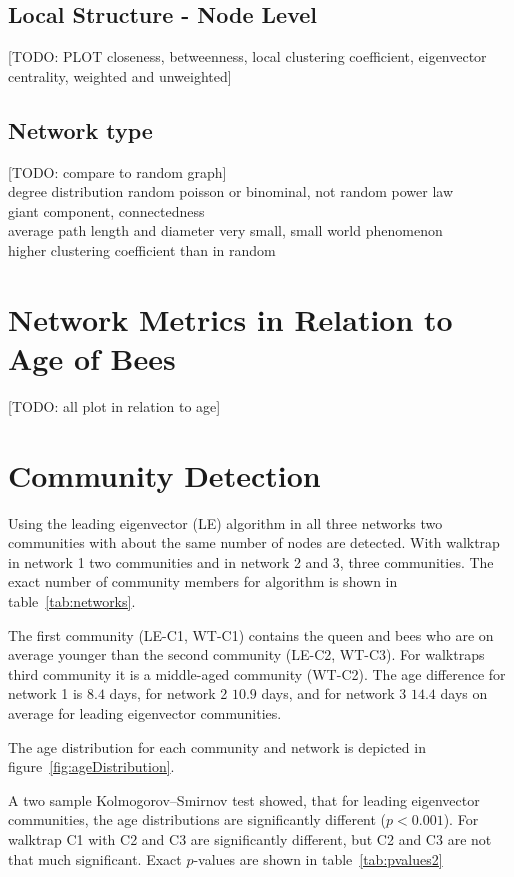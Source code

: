 \subsection{Local Structure - Node Level}

[TODO: PLOT closeness, betweenness, local clustering coefficient, eigenvector centrality, weighted and unweighted]

\subsection{Network type}

[TODO: compare to random graph]\\
degree distribution random poisson or binominal, not random power law\\
giant component, connectedness\\
average path length and diameter very small, small world phenomenon\\
higher clustering coefficient than in random\\

\section{Network Metrics in Relation to Age of Bees}

[TODO: all plot in relation to age]

\section{Community Detection}

Using the leading eigenvector (LE) algorithm in all three networks two communities with about the same number of nodes are detected. With walktrap in network 1 two communities and in network 2 and 3, three communities. The exact number of community members for algorithm is shown in table~\ref{tab:networks}.

The first community (LE-C1, WT-C1) contains the queen and bees who are on average younger than the second community (LE-C2, WT-C3). For walktraps third community it is a middle-aged community (WT-C2). The age difference for network 1 is $8.4$ days, for network 2 $10.9$ days, and for network 3 $14.4$ days on average for leading eigenvector communities.

The age distribution for each community and network is depicted in figure~\ref{fig:ageDistribution}.

A two sample Kolmogorov–Smirnov test showed, that for leading eigenvector communities, the age distributions are significantly different ($p< 0.001$). For walktrap C1 with C2 and C3 are significantly different, but C2 and C3 are not that much significant. Exact $p$-values are shown in table~\ref{tab:pvalues2}

